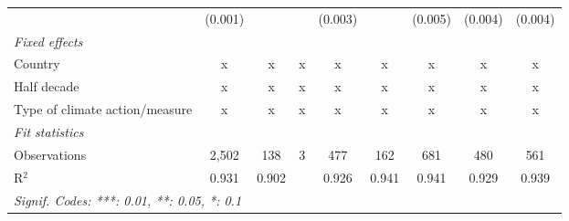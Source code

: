 \begin{table}[htbp]
\begin{tabular}{lcccccccc}
                                                                        & (0.001)       &                           &              & (0.003)        &                  & (0.005)         & (0.004)         & (0.004)\\   
      \emph{Fixed effects}\\
      Country                                                           & x             & x                         & x            & x              & x                & x               & x               & x\\  
      Half decade                                                       & x             & x                         & x            & x              & x                & x               & x               & x\\  
      Type of climate action/measure                                    & x             & x                         & x            & x              & x                & x               & x               & x\\  
      \midrule \emph{Fit statistics}\\
      Observations                                                      & 2,502         & 138                       & 3            & 477            & 162              & 681             & 480             & 561\\  
      R$^2$                                                             & 0.931         & 0.902                     &              & 0.926          & 0.941            & 0.941           & 0.929           & 0.939\\  
      \midrule
      \multicolumn{9}{l}{\emph{Signif. Codes: ***: 0.01, **: 0.05, *: 0.1}}\\
   \end{tabular}
\end{table}


